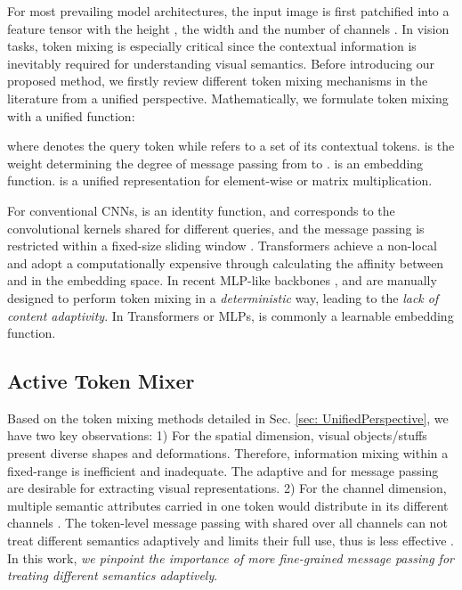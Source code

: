 \documentclass[letterpaper]{article} \usepackage{aaai23v}  \usepackage{times}  \usepackage{helvet}  \usepackage{courier}  \usepackage[hyphens]{url}  \usepackage{graphicx} \urlstyle{rm} \def\UrlFont{\rm}  \usepackage{caption} \frenchspacing  \setlength{\pdfpagewidth}{8.5in}  \setlength{\pdfpageheight}{11in}  \usepackage{algorithm}
\begin{document}
For most prevailing model architectures, the input image is first patchified into a feature tensor  with the height , the width  and the number of channels .
In vision tasks, token mixing is especially critical since the contextual information is inevitably required for understanding visual semantics.
Before introducing our proposed method, we firstly review different token mixing mechanisms in the literature from a unified perspective.
Mathematically, we formulate token mixing with a unified function:

where  denotes the query token while  refers to a set of its contextual tokens.
 is the weight determining the degree of message passing from  to .
 is an embedding function. 
 is a unified representation for element-wise or matrix multiplication.

For conventional CNNs,  is an identity function, and  corresponds to the convolutional kernels shared for different queries, and the message passing is restricted within a fixed-size sliding window . 
Transformers achieve a non-local  and adopt a computationally expensive
 through calculating the affinity between  and  in the embedding space. 
In recent MLP-like backbones \cite{chen2022cyclemlp,touvron2021resmlp,tolstikhin2021mlpmixer,zhang2021morphmlp,lian2021asmlp,tang2021sparsesMLP,tang2021imagewavemlp},  and  are manually designed to perform token mixing in a \textit{deterministic} way, 
leading to the \textit{lack of content adaptivity}. In Transformers or MLPs,  is commonly a learnable embedding function.





\subsection{Active Token Mixer}









Based on the token mixing methods detailed in Sec. \ref{sec: UnifiedPerspective}, we have two key observations:
1) For the spatial dimension, visual objects/stuffs present diverse shapes and deformations. Therefore, information mixing within a fixed-range
 \cite{touvron2021resmlp,chen2022cyclemlp,tolstikhin2021mlpmixer,lian2021asmlp} is inefficient and inadequate. The adaptive  and  for message passing are desirable for extracting visual representations.
2) For the channel dimension, multiple semantic attributes carried in one token would distribute in its different channels \cite{bau2020understanding,wu2021stylespace}. The token-level message passing with   shared over all channels can not treat different semantics adaptively and limits their full use, thus is less effective \cite{touvron2021resmlp,tolstikhin2021mlpmixer}. In this work, \textit{we pinpoint the importance of more fine-grained message passing for treating different semantics adaptively}.
\end{document}
